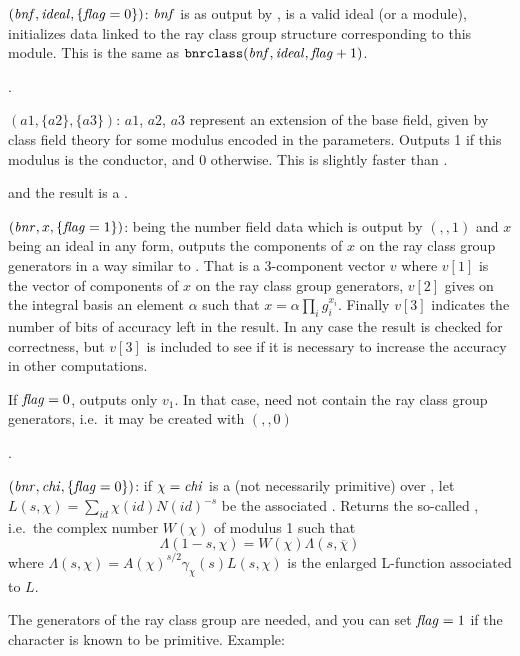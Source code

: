 $(\hbox{\it bnf\/},\hbox{\it ideal\/},\{\hbox{\it f\kern0pt lag\/}=0\})$: $\hbox{\it bnf\/}$ is as
output by ,  is a valid ideal (or a module),
initializes data linked
to the ray class group structure corresponding to this module. This is the
same as ${\tt bnrclass}(\hbox{\it bnf\/},\hbox{\it ideal\/},\hbox{\it f\kern0pt lag\/}+1)$.

.

$(a1,\{a2\},\{a3\})$: $a1$, $a2$, $a3$ represent
an extension of the base field, given by class field theory for some modulus
encoded in the parameters. Outputs 1 if this modulus is the conductor, and 0
otherwise. This is slightly faster than .

 and the result is a .

$(\hbox{\it bnr\/},x,\{\hbox{\it f\kern0pt lag\/}=1\})$:  being the
number field data which is output by $(,,1)$ and $x$ being an
ideal in any form, outputs the components of $x$ on the ray class group
generators in a way similar to . That is a 3-component
vector $v$ where $v[1]$ is the vector of components of $x$ on the ray class
group generators, $v[2]$ gives on the integral basis an element $\alpha$ such
that $x=\alpha\prod_ig_i^{x_i}$. Finally $v[3]$ indicates the number of bits
of accuracy left in the result. In any case the result is checked for
correctness, but $v[3]$ is included to see if it is necessary to increase the
accuracy in other computations.

If $\hbox{\it f\kern0pt lag\/}=0$, outputs only $v_1$. In that case,  need not contain the
ray class group generators, i.e.~it may be created with $(,,0)$

.

$(\hbox{\it bnr\/},\hbox{\it chi\/},\{\hbox{\it f\kern0pt lag\/}=0\})$:
if $\chi=\hbox{\it chi\/}$ is a (not necessarily primitive)
 over , let
$L(s,\chi) = \sum_{id} \chi(id) N(id)^{-s}$ be the associated
. Returns the so-called , i.e.~the
complex number $W(\chi)$ of modulus 1 such that
%
$$\Lambda(1-s,\chi) = W(\chi) \Lambda(s,\overline{\chi})$$
%
\noindent where $\Lambda(s,\chi) = A(\chi)^{s/2}\gamma_\chi(s) L(s,\chi)$ is
the enlarged L-function associated to $L$.

The generators of the ray class group are needed, and you can set $\hbox{\it f\kern0pt lag\/}=1$ if
the character is known to be primitive. Example:

